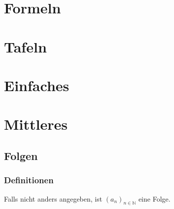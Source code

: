 \documentclass[a4paper, 9pt, DIV=24]{scrartcl}
\newcommand{\N}{\mathbb{N}}
\begin{document}
\clearpage


\section{Formeln}

\section{Tafeln}


\clearpage

\section{Einfaches}
\section{Mittleres}

\subsection{Folgen}
\subsubsection{Definitionen}
Falls nicht anders angegeben, ist $(a_n)_{n\in\N}$ eine Folge.
\end{document}
